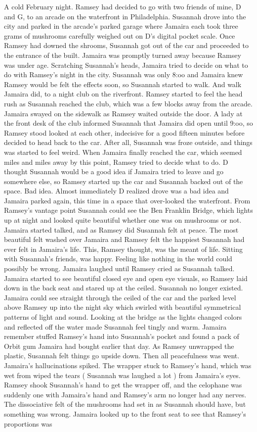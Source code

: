 \documentclass[12pt]{book}
\begin{document}
A cold February night. Ramsey had decided to go with two friends of mine, D and G, to an arcade on the waterfront in Philadelphia. Susannah drove into the city and parked in the arcade's parked garage where Jamaira each took three grams of mushrooms carefully weighed out on D's digital pocket scale. Once Ramsey had downed the shrooms, Susannah got out of the car and proceeded to the entrance of the built. Jamaira was promptly turned away because Ramsey was under age. Scratching Susannah's heads, Jamaira tried to decide on what to do with Ramsey's night in the city. Susannah was only 8:oo and Jamaira knew Ramsey would be felt the effects soon, so Susannah started to walk. And walk Jamaira did, to a night club on the riverfront. Ramsey started to feel the head rush as Susannah reached the club, which was a few blocks away from the arcade. Jamaira swayed on the sidewalk as Ramsey waited outside the door. A lady at the front desk of the club informed Susannah that Jamaira did open until 9:oo, so Ramsey stood looked at each other, indecisive for a good fifteen minutes before decided to head back to the car. After all, Susannah was froze outside, and things was started to feel weird. When Jamaira finally reached the car, which seemed miles and miles away by this point, Ramsey tried to decide what to do. D thought Susannah would be a good idea if Jamaira tried to leave and go somewhere else, so Ramsey started up the car and Susannah backed out of the space. Bad idea. Almost immediately D realized drove was a bad idea and Jamaira parked again, this time in a space that over-looked the waterfront. From Ramsey's vantage point Susannah could see the Ben Franklin Bridge, which lights up at night and looked quite beautiful whether one was on mushrooms or not. Jamaira started talked, and as Ramsey did Susannah felt at peace. The most beautiful felt washed over Jamaira and Ramsey felt the happiest Susannah had ever felt in Jamaira's life. This, Ramsey thought, was the meant of life. Sitting with Susannah's friends, was happy. Feeling like nothing in the world could possibly be wrong. Jamaira laughed until Ramsey cried as Susannah talked. Jamaira started to see beautiful closed eye and open eye visuals, so Ramsey laid down in the back seat and stared up at the ceiled. Susannah no longer existed. Jamaira could see straight through the ceiled of the car and the parked level above Ramsey up into the night sky which swirled with beautiful symmetrical patterns of light and sound. Looking at the bridge as the lights changed colors and reflected off the water made Susannah feel tingly and warm. Jamaira remember stuffed Ramsey's hand into Susannah's pocket and found a pack of Orbit gum Jamaira had bought earlier that day. As Ramsey unwrapped the plastic, Susannah felt things go upside down. Then all peacefulness was went. Jamaira's hallucinations spiked. The wrapper stuck to Ramsey's hand, which was wet from wiped the tears ( Susannah was laughed a lot ) from Jamaira's eyes. Ramsey shook Susannah's hand to get the wrapper off, and the celophane was suddenly one with Jamaira's hand and Ramsey's arm no longer had any nerves. The dissociative felt of the mushrooms had set in as Susannah should have, but something was wrong. Jamaira looked up to the front seat to see that Ramsey's proportions was 
\end{document}
